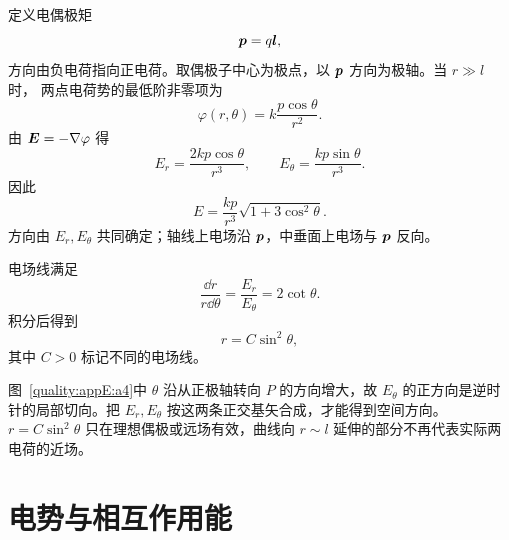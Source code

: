 \begin{xesolution}
定义电偶极矩
\[
  \bm{p}=q\bm{l},
\]
方向由负电荷指向正电荷。取偶极子中心为极点，以 $\bm{p}$ 方向为极轴。当 $r\gg l$ 时，
两点电荷势的最低阶非零项为
\[
  \varphi(r,\theta)=k\frac{p\cos\theta}{r^2}.
\]
由 $\bm{E}=-\nabla\varphi$ 得
\[
  \boxed{E_r=\frac{2kp\cos\theta}{r^3}},
  \qquad
  \boxed{E_\theta=\frac{kp\sin\theta}{r^3}}.
\]
因此
\[
  \boxed{E=\frac{kp}{r^3}\sqrt{1+3\cos^2\theta}}.
\]
方向由 $E_r,E_\theta$ 共同确定；轴线上电场沿 $\bm{p}$，中垂面上电场与 $\bm{p}$ 反向。

电场线满足
\[
  \frac{\dd r}{r\dd\theta}=\frac{E_r}{E_\theta}=2\cot\theta.
\]
积分后得到
\[
  \boxed{r=C\sin^2\theta},
\]
其中 $C>0$ 标记不同的电场线。


图~\ref{quality:appE:a4}中 $\theta$ 沿从正极轴转向 $P$ 的方向增大，故 $E_\theta$ 的正方向是逆时针的局部切向。把 $E_r,E_\theta$ 按这两条正交基矢合成，才能得到空间方向。$r=C\sin^2\theta$ 只在理想偶极或远场有效，曲线向 $r\sim l$ 延伸的部分不再代表实际两电荷的近场。
\end{xesolution}

\endgroup


\section{电势与相互作用能}

\begingroup

\graphicspath{{../../../sample/xes-original/nineteenth-section/}{../../../sample/xes-original/nineteenth-section/assets/}}


